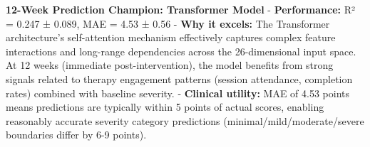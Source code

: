 \documentclass[conference]{IEEEtran}
\begin{document}
\begin{table*}[htbp]
\centering
\caption{Model performance comparison across phases for 12W and 24W timepoints.}
\end{table*}





\textbf{12-Week Prediction Champion: Transformer Model}
- \textbf{Performance:} R² = 0.247 ± 0.089, MAE = 4.53 ± 0.56
- \textbf{Why it excels:} The Transformer architecture's self-attention mechanism effectively captures complex feature interactions and long-range dependencies across the 26-dimensional input space. At 12 weeks (immediate post-intervention), the model benefits from strong signals related to therapy engagement patterns (session attendance, completion rates) combined with baseline severity.
- \textbf{Clinical utility:} MAE of 4.53 points means predictions are typically within 5 points of actual scores, enabling reasonably accurate severity category predictions (minimal/mild/moderate/severe boundaries differ by 6-9 points).
\end{document}
